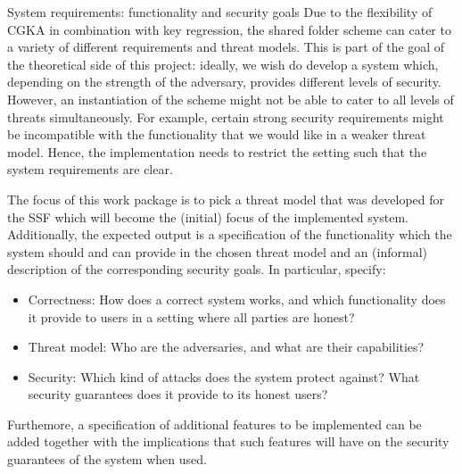 \documentclass[E]{BAMASA}
\begin{document}
\begin{workpackage}{System requirements: functionality and security goals}\label{wp:system-reqs}
    Due to the flexibility of CGKA in combination with key regression, 
    the shared folder scheme can cater to a variety of different requirements and threat models.
    This is part of the goal of the theoretical side of this project: 
    ideally, we wish do develop a system which, depending on the strength of the adversary,
    provides different levels of security.
    However, an instantiation of the scheme might not be able to cater to all levels of threats simultaneously.
    For example, certain strong security requirements might be incompatible with 
    the functionality that we would like in a weaker threat model.
    Hence, the implementation needs to restrict the setting such that the system requirements are clear.
    
    The focus of this work package is to pick a threat model that was developed for the SSF which 
    will become the (initial) focus of the implemented system.
    Additionally, the expected output is a specification of the functionality which the system should and can
    provide in the chosen threat model and an (informal) description of the corresponding security goals.
    In particular, specify:
    \begin{itemize}
        \item Correctness: How does a correct system works, and which functionality does it provide to users in a setting where all parties are honest?
        \item Threat model: Who are the adversaries, and what are their capabilities?
        \item Security: Which kind of attacks does the system protect against? What security guarantees does it provide to its honest users?
    \end{itemize}
    Furthemore, a specification of additional features to be implemented can be added together with the
    implications that such features will have on the security guarantees of the system when used.
\end{workpackage}
\end{document}

